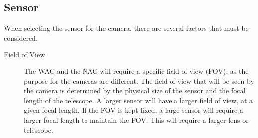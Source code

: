 \subsection{Sensor}
When selecting the sensor for the camera, there are several factors that must be considered\cite{sbig2014}. 
\begin{description}
\item[Field of View] The WAC and the NAC will require a specific field of view (FOV), as the purpose for the cameras are different. The field of view that will be seen by the camera is determined by the physical size of the sensor and the focal length of the telescope. A larger sensor will have a larger field of view, at a given focal length. If the FOV is kept fixed, a large sensor will require a larger focal length to maintain the FOV. This will require a larger lens or telescope\cite{sbig2014}. 


\end{description}
